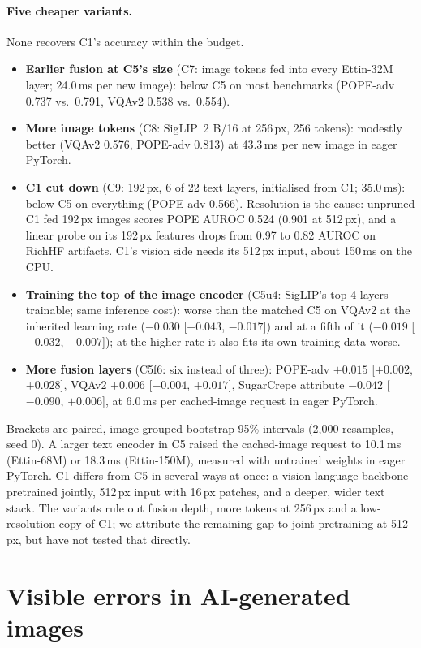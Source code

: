 \documentclass[10pt]{article}
\begin{document}
\paragraph{Five cheaper variants.} None recovers C1's accuracy within the budget.
\begin{itemize}\setlength\itemsep{1pt}
\item \textbf{Earlier fusion at C5's size} (C7: image tokens fed into every Ettin-32M layer; 24.0\,ms per new image): below C5 on most benchmarks (POPE-adv 0.737 vs.\ 0.791, VQAv2 0.538 vs.\ 0.554).
\item \textbf{More image tokens} (C8: SigLIP~2 B/16 at 256\,px, 256 tokens): modestly better (VQAv2 0.576, POPE-adv 0.813) at 43.3\,ms per new image in eager PyTorch.
\item \textbf{C1 cut down} (C9: 192\,px, 6 of 22 text layers, initialised from C1; 35.0\,ms): below C5 on everything (POPE-adv 0.566). Resolution is the cause: unpruned C1 fed 192\,px images scores POPE AUROC 0.524 (0.901 at 512\,px), and a linear probe on its 192\,px features drops from 0.97 to 0.82 AUROC on RichHF artifacts. C1's vision side needs its 512\,px input, about 150\,ms on the CPU.
\item \textbf{Training the top of the image encoder} (C5u4: SigLIP's top 4 layers trainable; same inference cost): worse than the matched C5 on VQAv2 at the inherited learning rate ($-0.030$ [$-0.043$, $-0.017$]) and at a fifth of it ($-0.019$ [$-0.032$, $-0.007$]); at the higher rate it also fits its own training data worse.
\item \textbf{More fusion layers} (C5f6: six instead of three): POPE-adv $+0.015$ [$+0.002$, $+0.028$], VQAv2 $+0.006$ [$-0.004$, $+0.017$], SugarCrepe attribute $-0.042$ [$-0.090$, $+0.006$], at 6.0\,ms per cached-image request in eager PyTorch.
\end{itemize}
Brackets are paired, image-grouped bootstrap 95\% intervals (2{,}000 resamples, seed 0). A larger text encoder in C5 raised the cached-image request to 10.1\,ms (Ettin-68M) or 18.3\,ms (Ettin-150M), measured with untrained weights in eager PyTorch. C1 differs from C5 in several ways at once: a vision-language backbone pretrained jointly, 512\,px input with 16\,px patches, and a deeper, wider text stack. The variants rule out fusion depth, more tokens at 256\,px and a low-resolution copy of C1; we attribute the remaining gap to joint pretraining at 512\,px, but have not tested that directly.

\section{Visible errors in AI-generated images}\label{sec:errors}
\end{document}
